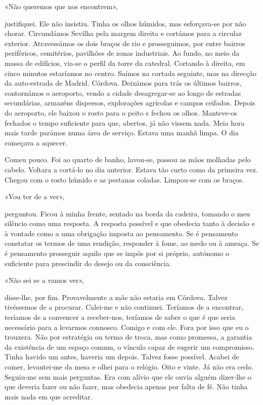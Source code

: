 «Não queremos que nos encontrem»,

justifiquei. Ele não insistiu. Tinha os olhos húmidos, mas
esforça­va­‑se por não chorar. Circundámos Sevilha pela margem direita e
cortámos para a circular exterior. Atravessámos os dois braços de rio e
prosseguimos, por entre bairros periféricos, cemitérios, pavilhões de
zonas industriais. Ao fundo, no meio da massa de edifícios, via­‑se o
perfil da torre da catedral. Cortando à direita, em cinco minutos
estaríamos no centro. Saímos na cortada seguinte, mas na direcção da
auto­‑estrada de Madrid. Córdova. Deixámos para trás os últimos bairros,
contornámos o aeroporto, vendo a cidade desagregar­‑se ao longo de
estradas secundárias, armazéns dispersos, explorações agrícolas e campos
ceifados. Depois do aeroporto, ele baixou o rosto para o peito e fechou
os olhos. Manteve­‑os fechados o tempo suficiente para que, abertos, já
não vissem nada. Meia hora mais tarde parámos numa área de serviço.
Estava uma manhã limpa. O dia começava a aquecer.

Comeu pouco. Foi ao quarto de banho, lavou­‑se, passou as mãos molhadas
pelo cabelo. Voltara a cortá­‑lo no dia anterior. Estava tão curto como
da primeira vez. Chegou com o rosto húmido e as pestanas coladas.
Limpou­‑se com os braços.

«Vou ter de a ver»,

perguntou. Ficou à minha frente, sentado na borda da cadeira, tomando o
meu silêncio como uma resposta. A resposta possível e que obedecia tanto
à decisão e à vontade como a uma obrigação imposta ao pensamento. Se é
pensamento constatar os termos de uma rendição, responder à fome, ao
medo ou à ameaça. Se é pensamento prosseguir aquilo que se impôs por si
próprio, autónomo o suficiente para prescindir do desejo ou da
consciência.

«Não sei se a vamos ver»,

disse­‑lhe, por fim. Provavelmente a mãe não estaria em Córdova. Talvez
tivéssemos de a procurar. Calei­‑me e não continuei. Teríamos de a
encontrar, teríamos de a convencer a receber­‑nos, teríamos de saber o
que é que seria necessário para a levarmos connosco. Comigo e com ele.
Fora por isso que eu o trouxera. Não por estratégia ou termo de troca,
mas como promessa, a garantia da existência de um espaço comum, o
vínculo capaz de sugerir um compromisso. Tinha havido um antes, haveria
um depois. Talvez fosse possível. Acabei de comer, levantei­‑me da mesa
e olhei para o relógio. Oito e vinte. Já não era cedo. Seguiu­‑me sem
mais perguntas. Era com alívio que ele ouvia alguém dizer­‑lhe o que
deveria fazer ou não fazer, mas obedecia apenas por falta de fé. Não
tinha mais nada em que acreditar.

